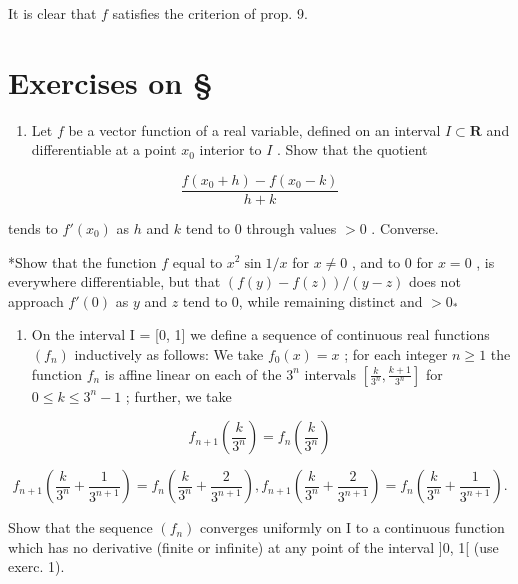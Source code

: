 It is clear that \(f\) satisfies the criterion of prop. 9.

\setcounter{exercisegroup}{0}
\section*{Exercises on \S{}}
{}

\begin{enumerate}
\def\labelenumi{\arabic{enumi})}
\tightlist
\item
  Let \(f\) be a vector function of a real variable, defined on an interval \(I \subset \mathbf{R}\) and differentiable at a point \(x_0\) interior to \(I\) . Show that the quotient
\end{enumerate}

\[
\frac {f (x _ {0} + h) - f (x _ {0} - k)}{h + k}
\]

tends to \(f'(x_0)\) as \(h\) and \(k\) tend to 0 through values \(> 0\) . Converse.

*Show that the function \(f\) equal to \(x^2 \sin 1/x\) for \(x \neq 0\) , and to 0 for \(x = 0\) , is everywhere differentiable, but that \((f(y) - f(z)) / (y - z)\) does not approach \(f'(0)\) as \(y\) and \(z\) tend to 0, while remaining distinct and \(>0_*\)

\begin{enumerate}
\def\labelenumi{\arabic{enumi})}
\setcounter{enumi}{1}
\tightlist
\item
  On the interval I = {[}0, 1{]} we define a sequence of continuous real functions \((f_{n})\) inductively as follows: We take \(f_{0}(x) = x\) ; for each integer \(n \geqslant 1\) the function \(f_{n}\) is affine linear on each of the \(3^{n}\) intervals \(\left[\frac{k}{3^{n}}, \frac{k+1}{3^{n}}\right]\) for \(0 \leqslant k \leqslant 3^{n}-1\) ; further, we take
\end{enumerate}

\[
f _ {n + 1} \left(\frac {k}{3 ^ {n}}\right) = f _ {n} \left(\frac {k}{3 ^ {n}}\right)
\]

\[
f _ {n + 1} \left(\frac {k}{3 ^ {n}} + \frac {1}{3 ^ {n + 1}}\right) = f _ {n} \left(\frac {k}{3 ^ {n}} + \frac {2}{3 ^ {n + 1}}\right), f _ {n + 1} \left(\frac {k}{3 ^ {n}} + \frac {2}{3 ^ {n + 1}}\right) = f _ {n} \left(\frac {k}{3 ^ {n}} + \frac {1}{3 ^ {n + 1}}\right).
\]

Show that the sequence \((f_{n})\) converges uniformly on I to a continuous function which has no derivative (finite or infinite) at any point of the interval {]}0, 1{[} (use exerc. 1).

